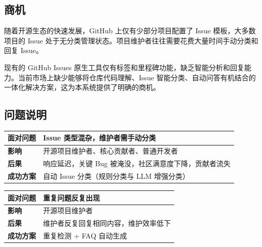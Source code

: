 \documentclass[10pt,a4paper]{article}
\newenvironment{ieeetable}{\begin{center}}{\end{center}}
\begin{document}
\subsection{商机}

随着开源生态的快速发展，GitHub 上仅有少部分项目配置了 Issue 模板，大多数项目的 Issue 处于无分类管理状态。项目维护者往往需要花费大量时间手动分类和回复 Issue。

现有的 GitHub Issues 原生工具仅有标签和里程碑功能，缺乏智能分析和回复能力。当前市场上缺少能够将仓库代码理解、Issue 智能分类、自动问答有机结合的一体化解决方案，这为本系统提供了明确的商机。

\subsection{问题说明}

\begin{ieeetable}
    \begin{tabularx}{\textwidth}{L{3.5cm} X}
        \toprule
        \textbf{面对问题} & Issue 类型混杂，维护者需手动分类 \\
        \midrule
        \textbf{影响} & 开源项目维护者、核心贡献者、普通开发者 \\
        \midrule
        \textbf{后果} & 响应延迟，关键 Bug 被淹没，社区满意度下降，贡献者流失 \\
        \midrule
        \textbf{成功方案} & 自动 Issue 分类（规则分类与 LLM 增强分类） \\
        \bottomrule
    \end{tabularx}
\end{ieeetable}

\vspace{4pt}

\begin{ieeetable}
    \begin{tabularx}{\textwidth}{L{3.5cm} X}
        \toprule
        \textbf{面对问题} & 重复问题反复出现 \\
        \midrule
        \textbf{影响} & 开源项目维护者 \\
        \midrule
        \textbf{后果} & 维护者反复回复相同内容，维护效率低下 \\
        \midrule
        \textbf{成功方案} & 重复检测 + FAQ 自动生成 \\
        \bottomrule
    \end{tabularx}
\end{ieeetable}

\vspace{4pt}
\end{document}
